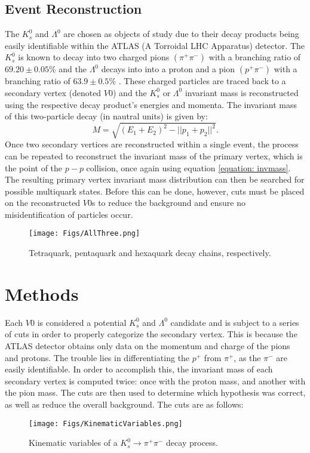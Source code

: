 \documentclass{article}
\begin{document}
\subsection{Event Reconstruction}
The $K^0_s$ and $\Lambda^0$ are chosen as objects of study due to their decay
products being easily identifiable within the ATLAS (A Torroidal LHC Apparatus) 
detector. The $K^0_s$ is
known to decay into two charged pions $(\pi^+\pi^-)$ with a branching ratio of
$69.20 \pm 0.05 \unit{\%}$ \cite{KBranchingRatio} and the $\Lambda^0$ decays
into into a proton and a pion $(p^+\pi^-)$ with a branching ratio of $63.9 \pm
0.5 \unit{\%}$ \cite{LBranchingRatio}. These charged particles are traced back to 
a secondary vertex (denoted $V0$) and the $K^0_s$ or $\Lambda^0$ invariant mass is reconstructed using the
respective decay product's energies and momenta.
The invariant mass of this two-particle 
decay (in nautral units) is given by:
\begin{equation}
M = \sqrt{(E_1 + E_2)^2 - ||p_1 + p_2||^2}.\label{equation: invmass} 
\end{equation}
Once two secondary vertices are reconstructed within a single event, the process 
can be repeated to reconstruct the invariant mass of the primary vertex, which is the point 
of the $p-p$ collision, once again using 
equation \ref{equation: invmass}. The resulting primary vertex invariant mass distribution can then be 
searched for possible multiquark states.
Before this can be done, however, cuts must be placed on the reconstructed $V0$s
to reduce the background and ensure no misidentification of particles occur.
\begin{figure}[!h]
\texttt{[image: Figs/AllThree.png]} 
\caption{Tetraquark, pentaquark and hexaquark decay chains, respectively.}
\end{figure}

\section{Methods}
Each $V0$ is considered a potential $K^0_s$ and $\Lambda^0$ candidate and is subject 
to a series of cuts in order to properly categorize the secondary vertex. This is because 
the ATLAS detector obtains only data on the momentum and charge of the pions and protons.
The trouble lies in differentiating the $p^+$ from $\pi^+$, as the  $\pi^-$ are easily 
identifiable. In order to accomplish this, the invariant mass of each secondary vertex 
is computed twice: once with the proton mass, and another with the pion mass. The cuts are 
then used to determine which hypothesis was correct, as well as reduce the overall background.
The cuts are as follows:\\
\vspace{-20pt}
\begin{wrapfigure}[16]{l}{0.40\textwidth}
  \texttt{[image: Figs/KinematicVariables.png]}
  \caption{\small Kinematic variables of a $K^0_s \rightarrow \pi^+\pi^-$ decay process.}\label{figure: KinematicVariables}
\end{wrapfigure}
\end{document}
